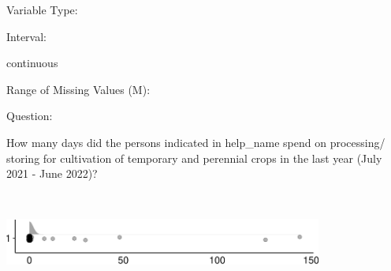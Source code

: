 \documentclass[
]{article}
\begin{document}
\begin{minipage}[t]{0.3\linewidth}

Variable Type:

\end{minipage}%
\begin{minipage}[t]{0.7\linewidth}

\end{minipage}

\begin{minipage}[t]{0.3\linewidth}

Interval:

\end{minipage}%
\begin{minipage}[t]{0.7\linewidth}

continuous

\end{minipage}

\begin{minipage}[t]{0.3\linewidth}

Range of Missing Values (M):

\end{minipage}%
\begin{minipage}[t]{0.7\linewidth}

\end{minipage}

\begin{minipage}[t]{0.3\linewidth}

Question:

\end{minipage}%
\begin{minipage}[t]{0.7\linewidth}

How many days did the persons indicated in help\_name spend on
processing/ storing for cultivation of temporary and perennial crops in
the last year (July 2021 - June 2022)?

\end{minipage}

\begin{minipage}[t]{0.3\linewidth}

~

\end{minipage}%
\begin{minipage}[t]{0.7\linewidth}

\includegraphics[width=396px]{codebook_template_files/figure-latex/q7_34_rainplot-1}

\end{minipage}
 \vspace*{-6mm} 
\end{document}
